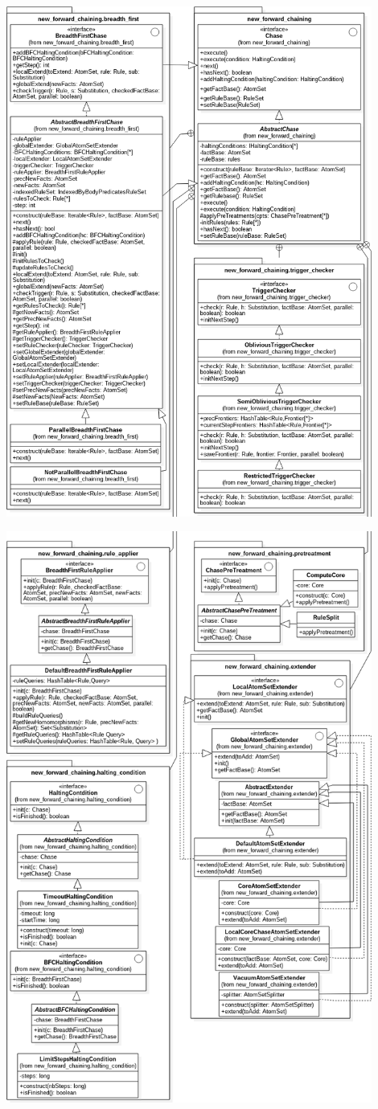         \begin{center}
        \includegraphics[width=0.9\textwidth]{pictures/diag_class_new_part_1.png}    \vspace{-30pt}      

        \includegraphics[width=0.9\textwidth]{pictures/diag_class_new_part_2.png} 
        \end{center}  